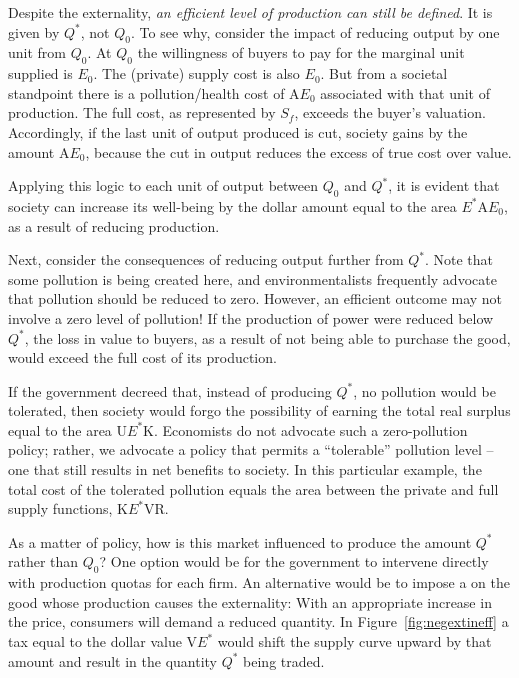 Despite the externality, \textit{an efficient level of production can still
be defined}. It is given by $Q^*$, not $Q_0$. To see why, consider the
impact of reducing output by one unit from $Q_0$. At $Q_0$ the willingness
of buyers to pay for the marginal unit supplied is $E_0$. The (private)
supply cost is also $E_0$. But from a societal standpoint there is a
pollution/health cost of A$E_0$ associated with that unit of production. The
full cost, as represented by $S_f$, exceeds the buyer's valuation.
Accordingly, if the last unit of output produced is cut, society gains by
the amount A$E_0$, because the cut in output reduces the excess of true cost
over value.

Applying this logic to each unit of output between $Q_0$ and $Q^*$, it is
evident that society can increase its well-being by the dollar amount equal
to the area $E^*$A$E_0$, as a result of reducing production.

Next, consider the consequences of reducing output further from $Q^*$.
Note that some pollution is being created here, and environmentalists
frequently advocate that pollution should be reduced to zero. However, an
efficient outcome may not involve a zero level of pollution! If the
production of power were reduced below $Q^*$, the loss in value to
buyers, as a result of not being able to purchase the good, would exceed the
full cost of its production.

If the government decreed that, instead of producing $Q^*$, no pollution
would be tolerated, then society would forgo the possibility of earning the
total real surplus equal to the area U$E^*$K. Economists do not advocate
such a zero-pollution policy; rather, we advocate a policy that permits a
``tolerable'' pollution level -- one that still results in net benefits to
society. In this particular example, the total cost of the tolerated
pollution equals the area between the private and full supply functions, K$%
E^*$VR.

\newhtmlpage

As a matter of policy, how is this market influenced to produce the amount $%
Q^*$ rather than $Q_0$? One option would be for the government to intervene
directly with production quotas for each firm. An alternative would be to
impose a  on the good whose production causes
the externality: With an appropriate increase in the price, consumers will
demand a reduced quantity. In Figure~\ref{fig:negextineff} a tax equal to
the dollar value V$E^*$ would shift the supply curve upward by that amount
and result in the quantity $Q^*$ being traded.

